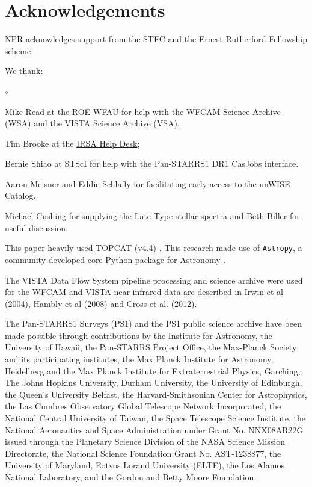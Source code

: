 \documentclass[usenatbib]{mnras}
\begin{document}
\section*{Acknowledgements}
NPR acknowledges support from the STFC and the Ernest Rutherford Fellowship scheme. 

We thank:
\begin{list}{$\circ$}{}  
\item Mike Read at the ROE WFAU for help with the WFCAM Science Archive (WSA) and the VISTA Science Archive (VSA). 
 \item Tim Brooke at the \href{https://irsasupport.ipac.caltech.edu/index.php}{IRSA Help Desk}; 
\item Bernie Shiao at STScI for help with the Pan-STARRS1 DR1 CasJobs interface. 
\item Aaron Meisner and Eddie Schlafly for facilitating early access to the unWISE Catalog. 
\item Michael Cushing for supplying the Late Type stellar spectra and Beth Biller for useful discussion. 
\end{list}


This paper heavily used \href{http://www.star.bris.ac.uk/~mbt/topcat/}{TOPCAT} (v4.4)
\citep[][]{Taylor2005, Taylor2011}.
This research made use of \href{http://www.astropy.org}{\tt Astropy}, 
a community-developed core Python package for Astronomy 
\citep{AstropyCollaboration2013, AstropyCollaboration2018}.

The VISTA Data Flow System pipeline processing and science archive were used for the WFCAM and VISTA 
near infrared data are described in Irwin et al (2004), Hambly et al (2008) and Cross et al. (2012). 

The Pan-STARRS1 Surveys (PS1) and the PS1 public science archive have
been made possible through contributions by the Institute for
Astronomy, the University of Hawaii, the Pan-STARRS Project Office,
the Max-Planck Society and its participating institutes, the Max
Planck Institute for Astronomy, Heidelberg and the Max Planck
Institute for Extraterrestrial Physics, Garching, The Johns Hopkins
University, Durham University, the University of Edinburgh, the
Queen's University Belfast, the Harvard-Smithsonian Center for
Astrophysics, the Las Cumbres Observatory Global Telescope Network
Incorporated, the National Central University of Taiwan, the Space
Telescope Science Institute, the National Aeronautics and Space
Administration under Grant No. NNX08AR22G issued through the Planetary
Science Division of the NASA Science Mission Directorate, the National
Science Foundation Grant No. AST-1238877, the University of Maryland,
Eotvos Lorand University (ELTE), the Los Alamos National Laboratory,
and the Gordon and Betty Moore Foundation.
\end{document}
